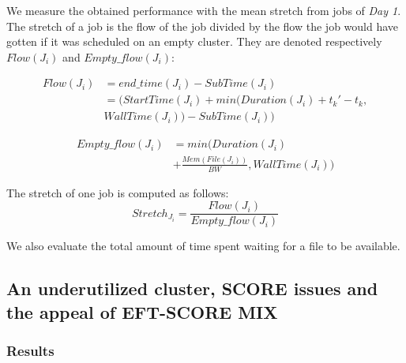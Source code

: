 \documentclass[conference,10pt]{IEEEtran}
\newcommand{\file}{\ensuremath{\mathit{File}}\xspace}
\newcommand{\memory}{\ensuremath{\mathit{Mem}}\xspace}
\newcommand{\duration}{\mathit{Duration}\xspace}
\newcommand{\bandwidth}{\mathit{BW}\xspace}
\newcommand{\submissiontime}{\mathit{SubTime}\xspace}
\newcommand{\walltime}{\mathit{WallTime}\xspace}
\newcommand{\start}{\mathit{StartTime}\xspace}
\begin{document}
We measure the obtained performance with the mean
stretch from jobs of \textit{Day 1}.
The stretch of a job is the flow of the job divided
by the flow the job would have gotten if it was scheduled on an empty cluster.
They are denoted respectively $Flow(J_i)$ and $Empty\_flow(J_i)$:

\begin{equation}
\begin{split}
Flow(J_i) & = end\_time(J_i) - \submissiontime(J_i) \\
& = (\start(J_i) + min(\duration(J_i) + t_k' - t_k, \\
& \walltime(J_i)) - \submissiontime(J_i))
\end{split}
\end{equation}

\begin{equation}
\begin{split}
Empty\_flow(J_i) & = min(\duration(J_i) \\
& + \frac{\memory(\file(J_i))}{\bandwidth}, \walltime(J_i))
\end{split}
\end{equation}

The stretch of one job is computed as follows:
\begin{equation}
Stretch_{J_i} = \frac{Flow(J_i)}{Empty\_flow(J_i)}
\end{equation}

We also evaluate the total amount of time spent waiting for a file to be available.

\subsection{An underutilized cluster, SCORE issues and the appeal of EFT-SCORE MIX}

\subsubsection{Results}
\end{document}
